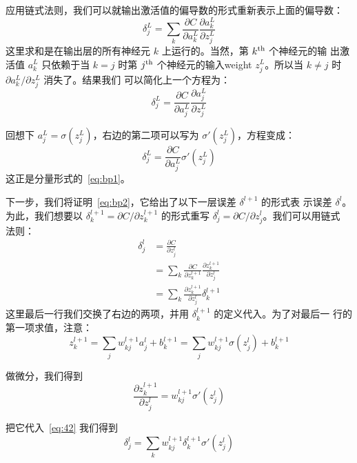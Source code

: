 应用链式法则，我们可以就输出激活值的偏导数的形式重新表示上面的偏导数：
\begin{equation}
  \delta^L_j = \sum_k \frac{\partial C}{\partial a^L_k} \frac{\partial a^L_k}{\partial z^L_j}
\label{eq:37}\tag{37}
\end{equation}
这里求和是在输出层的所有神经元 $k$ 上运行的。当然，第 $k^{\rm th}$ 个神经元的输
出激活值 $a^L_k$ 只依赖于当 $k=j$ 时第 $j^{\rm th}$ 个神经元的输入\gls*{weight}
$z^L_j$。所以当 $k \neq j$ 时 $\partial a^L_k / \partial z^L_j$ 消失了。结果我们
可以简化上一个方程为：
\begin{equation}
  \delta^L_j = \frac{\partial C}{\partial a^L_j} \frac{\partial a^L_j}{\partial z^L_j}
\label{eq:38}\tag{38}
\end{equation}

回想下 $a^L_j = \sigma(z^L_j)$，右边的第二项可以写为 $\sigma'(z^L_j)$，方程变成：
\begin{equation}
  \delta^L_j = \frac{\partial C}{\partial a^L_j} \sigma'(z^L_j)
\label{eq:39}\tag{39}
\end{equation}
这正是分量形式的~\eqref{eq:bp1}。

下一步，我们将证明~\eqref{eq:bp2}，它给出了以下一层误差 $\delta^{l+1}$ 的形式表
示误差 $\delta^l$。为此，我们想要以 $\delta^{l+1}_k = \partial C / \partial
z^{l+1}_k$ 的形式重写 $\delta^l_j = \partial C / \partial z^l_j$。我们可以用链式
法则：
\begin{align}
  \delta^l_j &= \frac{\partial C}{\partial z^l_j} \label{eq:40}\tag{40}\\
             &= \sum_k \frac{\partial C}{\partial z^{l+1}_k} \frac{\partial z^{l+1}_k}{\partial z^l_j} \label{eq:41}\tag{41}\\
             &= \sum_k \frac{\partial z^{l+1}_k}{\partial z^l_j} \delta^{l+1}_k \label{eq:42}\tag{42}
\end{align}
这里最后一行我们交换了右边的两项，并用 $\delta^{l+1}_k$ 的定义代入。为了对最后一
行的第一项求值，注意：
\begin{equation}
  z^{l+1}_k = \sum_j w^{l+1}_{kj} a^l_j +b^{l+1}_k = \sum_j w^{l+1}_{kj} \sigma(z^l_j) +b^{l+1}_k
\label{eq:43}\tag{43}
\end{equation}

做微分，我们得到
\begin{equation}
  \frac{\partial z^{l+1}_k}{\partial z^l_j} = w^{l+1}_{kj} \sigma'(z^l_j)
\label{eq:44}\tag{44}
\end{equation}

把它代入~\eqref{eq:42} 我们得到
\begin{equation}
  \delta^l_j = \sum_k w^{l+1}_{kj}  \delta^{l+1}_k \sigma'(z^l_j)
\label{eq:45}\tag{45}
\end{equation}

